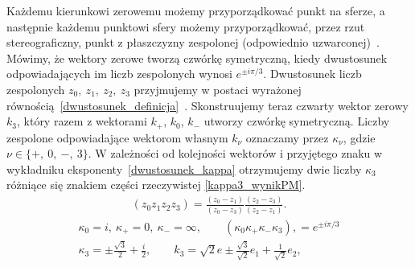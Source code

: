 Każdemu kierunkowi zerowemu możemy przyporządkować punkt na sferze,
a następnie każdemu punktowi sfery możemy przyporządkować,
przez rzut stereograficzny, 
punkt z płaszczyzny zespolonej 
(odpowiednio uzwarconej)~\cite{star1993algebra}.
Mówimy, że wektory zerowe tworzą czwórkę symetryczną,
 kiedy dwustosunek odpowiadających im liczb zespolonych 
 wynosi $e^{\pm i\pi/3}$.  
Dwustosunek liczb zespolonych $z_0,\ z_1,\ z_2,\ z_3$ przyjmujemy w 
postaci wyrażonej równością~\eqref{dwustosunek_definicja}~\cite{star1993algebra}.
Skonstruujemy teraz czwarty wektor zerowy $k_3$, który razem z 
wektorami $k_+$, $k_0$, $k_-$ utworzy czwórkę symetryczną.
Liczby zespolone odpowiadające wektorom własnym $k_\nu$ oznaczamy
przez $\kappa_\nu$, gdzie $\nu \in \{+,\ 0,\ -,\ 3\}$.
W zależności od kolejności wektorów i 
przyjętego znaku w wykładniku eksponenty~\eqref{dwustosunek_kappa}
otrzymujemy dwie liczby $\kappa_3$ różniące się znakiem części 
rzeczywistej \eqref{kappa3_wynikPM}. 
\begin{align}\label{dwustosunek_definicja}
(z_0z_1z_2z_3) = 
\frac{(z_0-z_1)}{(z_0-z_3)} 
\frac{(z_2-z_3)}{(z_2 -z_1)} .
\end{align}
\begin{align}\label{dwustosunek_kappa}
\kappa_0 = i,\ \kappa_+ = 0,\ \kappa_-=\infty,
\qquad (\kappa_0\kappa_+\kappa_-\kappa_3),
 = e^{\pm i\pi/3} \\ \label{kappa3_wynikPM}
\kappa_3 =\pm  \frac{\sqrt{3}}{2} + \frac{i}{2}, \qquad
k_3 = \sqrt{2} e\pm \frac{\sqrt{3}}{\sqrt{2}}e_1+ \frac{1}{\sqrt{2}} e_2 ,
\end{align}
